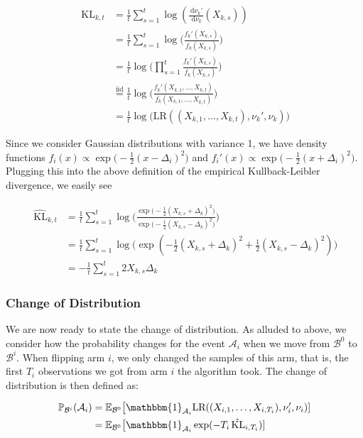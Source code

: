 \documentclass[12pt,]{article}
\newcommand{\KL}{\,\text{KL}}
\newcommand{\der}{\,\text{d}}
\begin{document}
\begin{align*}
\hat{\KL}_{k,t} & = \frac{1}{t} \sum_{s=1}^{t} \log(\frac{\der \nu_k'}{\der \nu_k}(X_{k,s})) \\
& = \frac{1}{t} \sum_{s=1}^{t} \log \big(\frac{f_k'(X_{k,s})}{f_k(X_{k,s})} \big) \\
& = \frac{1}{t} \log \big( \prod_{s=1}^{t} \frac{f_k'(X_{k,s})}{f_k(X_{k,s})} \big) \\
& \stackrel{\text{iid}}{=} \frac{1}{t} \log \big( \frac{f_k'(X_{k,1}, \dots,X_{k,t})}{f_k(X_{k,1}, \dots,X_{k,t})} \big) \\
& = \frac{1}{t} \log \big( \text{LR}((X_{k,1}, \dots,X_{k,t}), \nu_k', \nu_k) \big)
\end{align*}

Since we consider Gaussian distributions with variance 1, we have
density functions
\(f_i(x) \propto \exp \big(-\frac{1}{2} (x-\Delta_i)^2\big)\) and
\(f_i'(x) \propto \exp \big(-\frac{1}{2} (x+\Delta_i)^2\big)\). Plugging
this into the above definition of the empirical Kullback-Leibler
divergence, we easily see

\begin{align*}
\hat{\KL}_{k,t} & = \frac{1}{t} \sum_{s=1}^{t} \log \big(\frac{\exp \big(-\frac{1}{2} (X_{k,s}+\Delta_k)^2\big)}{\exp \big(-\frac{1}{2} (X_{k,s}-\Delta_k)^2\big)} \big) \\
& = \frac{1}{t} \sum_{s=1}^{t} \log \big( \exp(-\frac{1}{2} (X_{k,s}+\Delta_k)^2 + \frac{1}{2} (X_{k,s}-\Delta_k)^2) \big) \\
& = - \frac{1}{t} \sum_{s=1}^{t} 2 X_{k,s} \Delta_k
\end{align*}

\subsubsection{Change of Distribution}\label{change-of-distribution}

We are now ready to state the change of distribution. As alluded to
above, we consider how the probability changes for the event
\(\mathcal{A}_i\) when we move from \(\mathcal{B}^0\) to
\(\mathcal{B}^i\). When flipping arm \(i\), we only changed the samples
of this arm, that is, the first \(T_i\) observations we got from arm
\(i\) the algorithm took. The change of distribution is then defined as:

\begin{align*}
\mathbb{P}_{\mathcal{B}^i}(\mathcal{A}_i) & = \mathbb{E}_{\mathcal{B}^0} \big[\mathbbm{1}_{\mathcal{A}_i} \text{LR}((X_{i,1}, \dots,X_{i,T_i}), \nu_i', \nu_i) ] \\
& = \mathbb{E}_{\mathcal{B}^0} \big[\mathbbm{1}_{\mathcal{A}_i} \exp (- T_i \hat{\KL}_{i,T_i}) ]
\end{align*}
\end{document}
